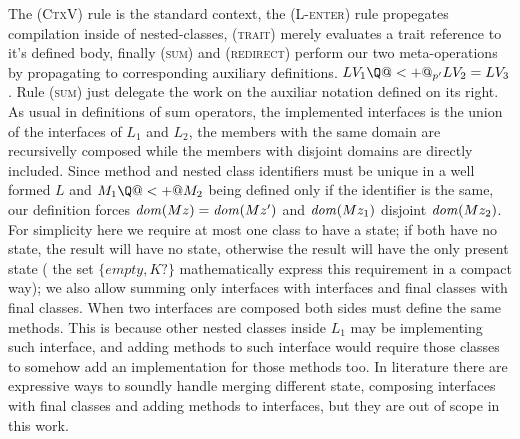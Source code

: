 The \textsc{(CtxV)} rule is the standard context, the \textsc{(L-enter)} rule propegates compilation inside of nested-classes, \textsc{(trait)} merely evaluates a trait reference to it’s defined body,
finally \textsc{(sum)} and \textsc{(redirect)} perform our two meta-operations by propagating to 
corresponding auxiliary definitions.
$LV_1 \Q@<+@_{p'} LV_2 = LV_3$.
Rule \textsc{(sum)} just delegate the work on the auxiliar notation defined on its right.
As usual in definitions of sum operators,
the implemented interfaces is the union of the interfaces of $L_1$ and $L_2$, the members with the same domain are recursivelly composed while the members with disjoint domains are directly included.
Since method and nested class identifiers must be unique in a well formed $L$ and $M_1 \Q@<+@ M_2$  being defined only if the identifier is the same,
our definition forces $\mathit{dom}(Mz)=\mathit{dom}(Mz')$ and
$\mathit{dom}(Mz_1)$ disjoint $\mathit{dom}(Mz_2)$.
For simplicity here 
 we require at most one class to have a state; if both have no state, the result will have no state, otherwise the result will have the only present state (
the set $\{empty,K?\}$ mathematically express this requirement in a compact way);
we also allow summing
only interfaces with interfaces and final classes with final classes. When two interfaces are composed both sides must define the same methods.
This is because other nested classes inside $L_1$ may be implementing such interface, and adding methods to such interface would require those classes to somehow add an implementation for those methods too.
In literature there are expressive ways to soundly handle merging different state, composing interfaces with final classes and
adding methods to interfaces, but they are out of scope in this work.

